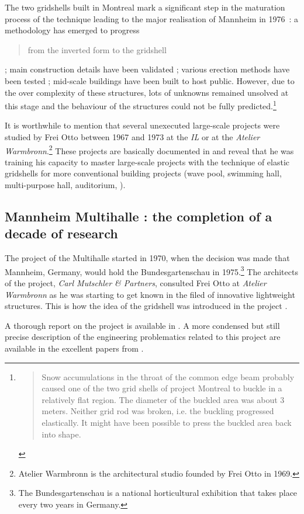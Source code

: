 The two gridshells built in Montreal mark a significant step in the maturation process of the technique leading to the major realisation of Mannheim in 1976~: a methodology has emerged to progress \blockcquote[p.~179]{IL10}{from the inverted form to the gridshell} ; main construction details have been validated ; various erection methods have been tested ; mid-scale buildings have been built to host public. However, due to the over complexity of these structures, lots of unknowns remained unsolved at this stage and the behaviour of the structures could not be fully predicted.\footnote{\blockcquote[p.~219]{IL10}{Snow accumulations in the throat of the common edge beam probably caused one of the two grid shells of project Montreal to buckle in a relatively flat region. The diameter of the buckled area was about 3 meters. Neither grid rod was broken, i.e. the buckling progressed elastically. It might have been possible to press the buckled area back into shape.}}

It is worthwhile to mention that several unexecuted large-scale projects were studied by Frei Otto between 1967 and 1973 at the \emph{IL} or at the \emph{Atelier Warmbronn}.\footnote{Atelier Warmbronn is the architectural studio founded by Frei Otto in 1969.} These projects are basically documented in \cite[pp.~278 - 288]{IL10} and reveal that he was training his capacity to master large-scale projects with the technique of elastic gridshells for more conventional building projects (wave pool, swimming hall, multi-purpose hall, auditorium, \telp{}).



\subsection{Mannheim Multihalle : the completion of a decade of research}
The project of the Multihalle started in 1970, when the decision was made that Mannheim, Germany, would hold the Bundesgartenschau in 1975.\footnote{The Bundesgartenschau is a national horticultural exhibition that takes place every two years in Germany.} The architects of the project, \emph{Carl Mutschler \& Partners}, consulted Frei Otto at \emph{Atelier Warmbronn} as he was starting to get known in the filed of innovative lightweight structures. This is how the idea of the gridshell was introduced in the project \cite{Liddell2015}.

A thorough report on the project is available in \cite{IL13}.  A more condensed but still precise description of the engineering problematics related to this project are available in the excellent papers from \citet{Happold1975, Liddell2015}.

